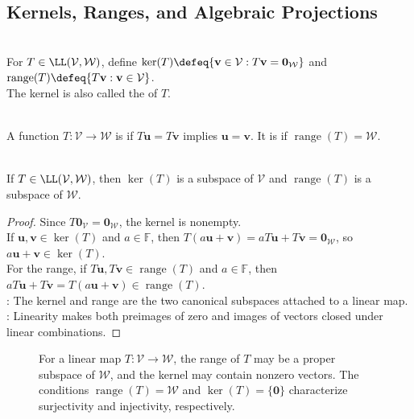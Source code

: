\subsection{Kernels, Ranges, and Algebraic Projections}
\begin{definition} \label{def:kernel-and-range-linear-map} \\
For $T\in\LL(\mathcal{V},\mathcal{W})$, define
$\ker(T)\defeq\{\mathbf{v}\in\mathcal{V}:T\mathbf{v}=\mathbf{0}_{\mathcal{W}}\}$ and
$\operatorname{range}(T)\defeq\{T\mathbf{v}:\mathbf{v}\in\mathcal{V}\}$.\\
The kernel is also called the  of $T$.
\end{definition}

\begin{definition} \\
A function $T:\mathcal{V}\to\mathcal{W}$ is  if $T\mathbf{u}=T\mathbf{v}$ implies $\mathbf{u}=\mathbf{v}$. It is  if $\operatorname{range}(T)=\mathcal{W}$.
\end{definition}

\begin{proposition} \label{prop:kernel-and-range-are-subspaces} \\
If $T \in \LL(\mathcal{V}, \mathcal{W})$, then $\ker(T)$ is a subspace of $\mathcal{V}$ and $\operatorname{range}(T)$ is a subspace of $\mathcal{W}$.
\begin{proof}
Since $T\mathbf{0}_{\mathcal{V}}=\mathbf{0}_{\mathcal{W}}$, the kernel is nonempty.\\
If $\mathbf{u},\mathbf{v}\in\ker(T)$ and $a\in\mathbb{F}$, then $T(a\mathbf{u}+\mathbf{v})=aT\mathbf{u}+T\mathbf{v}=\mathbf{0}_{\mathcal{W}}$, so $a\mathbf{u}+\mathbf{v}\in\ker(T)$.\\
For the range, if $T\mathbf{u},T\mathbf{v}\in\operatorname{range}(T)$ and $a\in\mathbb{F}$, then $aT\mathbf{u}+T\mathbf{v}=T(a\mathbf{u}+\mathbf{v})\in\operatorname{range}(T)$.\\
: The kernel and range are the two canonical subspaces attached to a linear map.\\
: Linearity makes both preimages of zero and images of vectors closed under linear combinations.
\end{proof}
\end{proposition}

\begin{figure}[H]
\centering
\scalebox{0.75}{}
\caption{For a linear map $T:\mathcal{V}\to\mathcal{W}$, the range of $T$ may be a proper subspace of $\mathcal{W}$, and the kernel may contain nonzero vectors. The conditions $\operatorname{range}(T)=\mathcal{W}$ and $\ker(T)=\{\mathbf{0}\}$ characterize surjectivity and injectivity, respectively.}
\label{fig:kernel-range-linear-map}
\end{figure}

